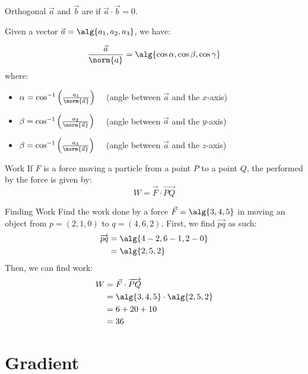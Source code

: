 \documentclass[12pt]{report}
\begin{document}
\begin{dfnbox}{Orthogonal}{}
    $\vec{a}$ and $\vec{b}$ are  if $\vec{a} \cdot \vec{b} = 0$.
\end{dfnbox}

Given a vector $\vec{a} = \alg{a_1, a_2, a_3}$, we have:

\[ \frac{\vec{a}}{\norm{a}} = \alg{\cos \alpha, \cos \beta, \cos \gamma} \]
where:
\begin{itemize}
    \item $\alpha = \cos^{-1} \left( \frac{a_1}{\norm{\vec{a}}} \right) \quad$ (angle between $\vec{a}$ and the $x$-axis)
    \item $\beta = \cos^{-1} \left( \frac{a_2}{\norm{\vec{a}}} \right) \quad$ (angle between $\vec{a}$ and the $y$-axis)
    \item $\beta = \cos^{-1} \left( \frac{a_3}{\norm{\vec{a}}} \right) \quad$ (angle between $\vec{a}$ and the $z$-axis)
\end{itemize}

\begin{dfnbox}{Work}{}
    If $F$ is a force moving a particle from a point $P$ to a point $Q$, the  performed by the force is given by:
    \[ W = \vec{F} \cdot \overrightarrow{PQ} \]
\end{dfnbox}

\begin{exbox}{Finding Work}{}
    Find the work done by a force $\vec{F} = \alg{3,4,5}$ in moving an object from $p = (2,1,0)$ to $q = (4,6,2)$.
    \tcblower
    First, we find $\overrightarrow{pq}$ as such:
    \begin{align*}
        \overrightarrow{pq}
        &= \alg{4-2, 6-1, 2-0} \\
        &= \alg{2,5,2}
    \end{align*}
    Then, we can find work:
    \begin{align*}
        W
        &= \vec{F} \cdot \overrightarrow{PQ} \\
        &= \alg{3,4,5} \cdot \alg{2,5,2} \\
        &= 6 + 20 + 10 \\
        &= 36
    \end{align*}
\end{exbox}

\section{Gradient}
\end{document}
